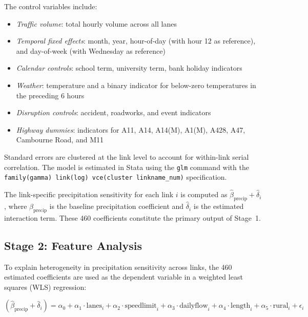 \documentclass[review]{elsarticle}
\begin{document}
The control variables include:

\begin{itemize}
    \item \textit{Traffic volume}: total hourly volume across all lanes
    \item \textit{Temporal fixed effects}: month, year, hour-of-day (with hour 12 as reference), and day-of-week (with Wednesday as reference)
    \item \textit{Calendar controls}: school term, university term, bank holiday indicators
    \item \textit{Weather}: temperature and a binary indicator for below-zero temperatures in the preceding 6 hours
    \item \textit{Disruption controls}: accident, roadworks, and event indicators
    \item \textit{Highway dummies}: indicators for A11, A14, A14(M), A1(M), A428, A47, Cambourne Road, and M11
\end{itemize}

Standard errors are clustered at the link level to account for within-link serial correlation. The model is estimated in Stata using the \texttt{glm} command with the \texttt{family(gamma) link(log) vce(cluster linkname\_num)} specification.

The link-specific precipitation sensitivity for each link $i$ is computed as $\hat{\beta}_{\text{precip}} + \hat{\delta}_i$, where $\hat{\beta}_{\text{precip}}$ is the baseline precipitation coefficient and $\hat{\delta}_i$ is the estimated interaction term. These 460 coefficients constitute the primary output of Stage~1.

\subsection{Stage 2: Feature Analysis}
\label{sec:method:feature}

To explain heterogeneity in precipitation sensitivity across links, the 460 estimated coefficients are used as the dependent variable in a weighted least squares (WLS) regression:

\begin{equation}
\label{eq:wls}
(\hat{\beta}_{\text{precip}} + \hat{\delta}_i) = \alpha_0 + \alpha_1 \cdot \text{lanes}_i + \alpha_2 \cdot \text{speedlimit}_i + \alpha_3 \cdot \text{dailyflow}_i + \alpha_4 \cdot \text{length}_i + \alpha_5 \cdot \text{rural}_i + \epsilon_i
\end{equation}
\end{document}
